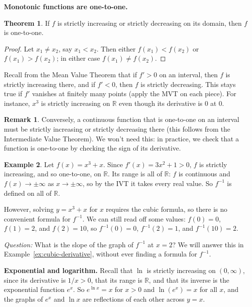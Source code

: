 \documentclass[12pt,letterpaper]{article}
\theoremstyle{definition}
\newtheorem{theorem}{Theorem}[section]
\newtheorem{example}[theorem]{Example}
\newtheorem*{remark}{Remark}
\begin{document}
\textbf{Monotonic functions are one-to-one.}

\begin{theorem}
  If $f$ is strictly increasing or strictly decreasing on its domain, then $f$
  is one-to-one.
\end{theorem}

\begin{proof}
  Let $x_1\neq x_2$, say $x_1<x_2$. Then either $f(x_1)<f(x_2)$ or
  $f(x_1)>f(x_2)$; in either case $f(x_1)\neq f(x_2)$.
\end{proof}

Recall from the Mean Value Theorem that if $f'>0$ on an interval, then $f$ is
strictly increasing there, and if $f'<0$, then $f$ is strictly decreasing.
This stays true if $f'$ vanishes at finitely many points (apply the MVT on each
piece). For instance, $x^3$ is strictly increasing on $\mathbb{R}$ even though
its derivative is $0$ at $0$.

\begin{remark}
  Conversely, a continuous function that is one-to-one on an interval must be
  strictly increasing or strictly decreasing there (this follows from the
  Intermediate Value Theorem). We won't need this: in practice, we check that a
  function is one-to-one by checking the sign of its derivative.
\end{remark}

\begin{example}\label{ex:cubic}
  Let $f(x)=x^3+x$. Since $f'(x)=3x^2+1>0$, $f$ is strictly increasing, and so
  one-to-one, on $\mathbb{R}$. Its range is all of $\mathbb{R}$: $f$ is
  continuous and $f(x)\to\pm\infty$ as $x\to\pm\infty$, so by the IVT it takes
  every real value. So $f^{-1}$ is defined on all of $\mathbb{R}$.

  However, solving $y=x^3+x$ for $x$ requires the cubic formula, so there is
  no convenient formula for $f^{-1}$. We can still read off some values:
  $f(0)=0$, $f(1)=2$, and $f(2)=10$, so $f^{-1}(0)=0$, $f^{-1}(2)=1$, and
  $f^{-1}(10)=2$.

  \emph{Question:} What is the slope of the graph of $f^{-1}$ at $x=2$? We
  will answer this in Example~\ref{ex:cubic-derivative}, without ever finding
  a formula for $f^{-1}$.
\end{example}

\textbf{Exponential and logarithm.} Recall that $\ln$ is strictly increasing
on $(0,\infty)$, since its derivative is $1/x>0$, that its range is
$\mathbb{R}$, and that its inverse is the exponential function $e^x$. So
$e^{\ln x}=x$ for $x>0$ and $\ln(e^x)=x$ for all $x$, and the graphs of $e^x$
and $\ln x$ are reflections of each other across $y=x$.
\end{document}
